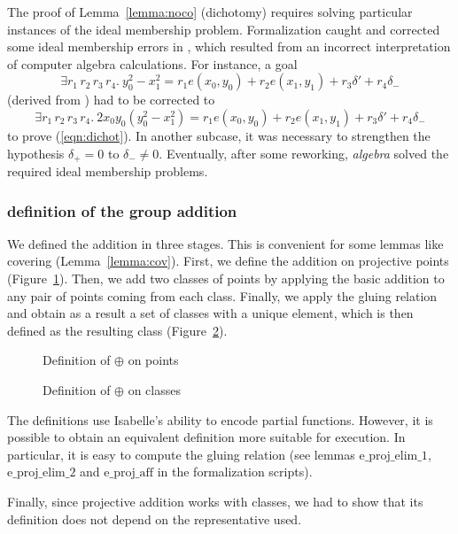 \documentclass{llncs}
\begin{document}
The proof of Lemma~\ref{lemma:noco} (dichotomy) requires solving
particular instances of the ideal membership problem.  Formalization
caught and corrected some ideal membership errors in
\cite{hales2016group}, which resulted from an incorrect interpretation
of computer algebra calculations.  For instance, a goal
\[
\exists r_1 \, r_2 \, r_3 \, r_4.\ 
y_0^2 - x_1^2 = r_1 e(x_0,y_0) + r_2 e(x_1,y_1) + r_3 \delta' + r_4
\delta_{-} 
\] 
(derived from \cite{hales2016group})
had to be corrected to 
\[
\exists r_1 \, r_2 \, r_3 \, r_4.\ 
2 x_0 y_0 (y_0^2 - x_1^2) = r_1 e(x_0,y_0) + r_2 e(x_1,y_1) + r_3 \delta' + r_4
\delta_{-}
\]
to prove (\ref{eqn:dichot}).
In another subcase, it was necessary to strengthen the hypothesis
$\delta_{+} = 0$ to $\delta_{-} \neq 0$. Eventually, after some reworking,
\textit{algebra} solved the required ideal membership
problems.


\subsubsection{definition of the group addition}

We defined the addition in three stages. This is convenient for some
lemmas like covering (Lemma~\ref{lemma:cov}). 
First, we define the addition on projective
points (Figure~\ref{fig3}). Then, we add two classes of points by
applying the basic addition to any pair of points coming from each
class. Finally, we apply the gluing relation and obtain as a result a
set of classes with a unique element, which is then defined as the
resulting class (Figure~\ref{fig4}).

\begin{figure}
{}
\caption{Definition of $\oplus$ on points}
\label{fig3}
\end{figure}
\begin{figure}
	{}
	{}
	\caption{Definition of $\oplus$ on classes}
	\label{fig4}
\end{figure}

The definitions use Isabelle's ability to encode partial
functions. However, it is possible to obtain an equivalent definition
more suitable for execution. In particular, it is easy to compute the
gluing relation (see lemmas $\text{e\_proj\_elim\_1}$,
$\text{e\_proj\_elim\_2}$ and $\text{e\_proj\_aff}$ in the
formalization scripts).

Finally, since projective addition works with classes, we had to show
that its definition does not depend on the representative used.
\end{document}
